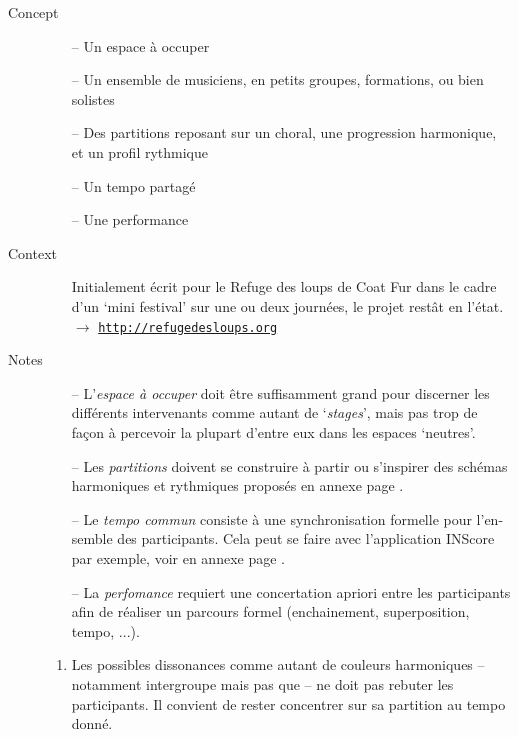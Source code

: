 \begin{description}
\item[Concept] \hfill 
\begin{itemize}
\item[--] Un espace \`{a} occuper
\item[--] Un ensemble de musiciens, en petits groupes, formations, ou bien solistes  
\item[--] Des partitions reposant sur un choral, une progression harmonique, et un profil rythmique
\item[--] Un tempo partagé 
\item[--] Une performance 
\end{itemize}
\bigskip
\item[Context] \hfill 
\begin{itemize}
\item[] Initialement \'{e}crit pour le Refuge des loups de Coat Fur dans le cadre d'un `mini festival' sur une ou deux journ\'{e}es, le projet rest\^{a}t en l'\'{e}tat. \\ $\rightarrow$ \href{http://refugedesloups.org}{\texttt{\small http://refugedesloups.org}}
\end{itemize}
\bigskip
\item[Notes] \hfill 
\begin{itemize}
\item[--] L'\textit{espace \`{a} occuper} doit \^{e}tre suffisamment grand pour discerner les diff\'{e}rents intervenants comme autant de `\textit{stages}', mais pas trop de fa\c{c}on \`{a} percevoir la plupart d'entre eux dans les espaces `neutres'.
\item[--] Les \textit{partitions} doivent se construire \`{a} partir ou s'inspirer des sch\'{e}mas harmoniques et rythmiques propos\'{e}s en annexe page \pageref{dlcscore}.
\item[--] Le \textit{tempo commun} consiste \`{a} une synchronisation formelle pour l'en- semble des participants. Cela peut se faire avec l'application INScore par exemple, voir en annexe page \pageref{inscore}.
\item[--] La \textit{perfomance} requiert une concertation apriori entre les participants afin de r\'{e}aliser un parcours formel (enchainement, superposition, tempo, ...).
\end{itemize}

\begin{enumerate}

\item Les possibles dissonances comme autant de couleurs harmoniques -- notamment intergroupe mais pas que -- ne doit pas rebuter les participants. Il convient de rester concentrer sur sa partition au tempo donn\'{e}.


\end{enumerate}
\end{description}
